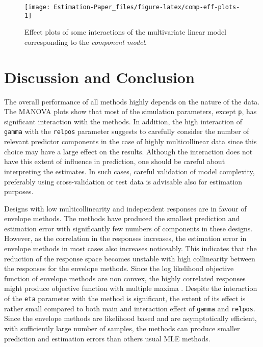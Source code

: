 \documentclass[12pt,3p,authoryear]{elsarticle}
\begin{document}
\begin{figure}[!htb]
\texttt{[image: Estimation-Paper\_files/figure-latex/comp-eff-plots-1]} \caption{Effect plots of some interactions of the multivariate linear model corresponding to the \emph{component model}.}\label{fig:comp-eff-plots}
\end{figure}

\hypertarget{discussion-and-conclusion}{%
\section{Discussion and Conclusion}\label{discussion-and-conclusion}}

The overall performance of all methods highly depends on the nature of the data. The MANOVA plots show that most of the simulation parameters, except \texttt{p}, has significant interaction with the methods. In addition, the high interaction of \texttt{gamma} with the \texttt{relpos} parameter suggests to carefully consider the number of relevant predictor components in the case of highly multicollinear data since this choice may have a large effect on the results. Although the interaction does not have this extent of influence in prediction, one should be careful about interpreting the estimates. In such cases, careful validation of model complexity, preferably using cross-validation or test data is advisable also for estimation purposes.

Designs with low multicollinearity and independent responses are in favour of envelope methods. The methods have produced the smallest prediction and estimation error with significantly few numbers of components in these designs. However, as the correlation in the responses increases, the estimation error in envelope methods in most cases also increases noticeably. This indicates that the reduction of the response space becomes unstable with high collinearity between the responses for the envelope methods. Since the log likelihood objective function of envelope methods are non convex, the highly correlated responses might produce objective function with multiple maxima \citep{cook2016algorithms}. Despite the interaction of the \texttt{eta} parameter with the method is significant, the extent of its effect is rather small compared to both main and interaction effect of \texttt{gamma} and \texttt{relpos}. Since the envelope methods are likelihood based and are asymptotically efficient, with sufficiently large number of samples, the methods can produce smaller prediction and estimation errors than others usual MLE methods.
\end{document}

